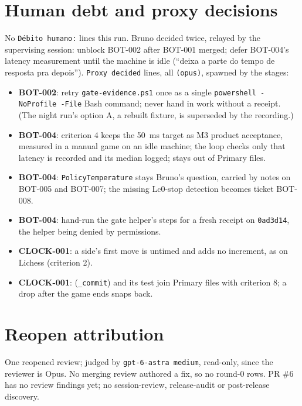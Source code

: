 \documentclass[11pt,a4paper]{article}
\begin{document}
\section*{Human debt and proxy decisions}

No \texttt{Débito humano:} lines this run. Bruno decided twice, relayed by the supervising
session: unblock BOT-002 after BOT-001 merged; defer BOT-004's latency measurement until the
machine is idle (``deixa a parte do tempo de resposta pra depois''). \texttt{Proxy decided}
lines, all \texttt{(opus)}, spawned by the stages:

\begin{itemize}
  \item \textbf{BOT-002}: retry \texttt{gate-evidence.ps1} once as a single
        \texttt{powershell -NoProfile -File} Bash command; never hand in work without a
        receipt. (The night run's option A, a rebuilt fixture, is superseded by the
        recording.)
  \item \textbf{BOT-004}: criterion 4 keeps the 50~ms target as M3 product acceptance,
        measured in a manual game on an idle machine; the loop checks only that latency is
        recorded and its median logged;  stays out of Primary files.
  \item \textbf{BOT-004}: \texttt{PolicyTemperature} stays Bruno's question, carried by notes
        on BOT-005 and BOT-007; the missing Lc0-stop detection becomes ticket BOT-008.
  \item \textbf{BOT-004}: hand-run the gate helper's steps for a fresh receipt on
        \texttt{0ad3d14}, the helper being denied by permissions.
  \item \textbf{CLOCK-001}: a side's first move is untimed and adds no increment, as on
        Lichess (criterion 2).
  \item \textbf{CLOCK-001}:  (\texttt{\_commit}) and its test join
        Primary files with criterion 8; a drop after the game ends snaps back.
\end{itemize}

\section*{Reopen attribution}

One reopened review; judged by \texttt{gpt-6-astra medium}, read-only, since the reviewer is
Opus. No merging review authored a fix, so no round-0 rows. PR \#6 has no review findings yet;
no session-review, release-audit or post-release discovery.
\end{document}
